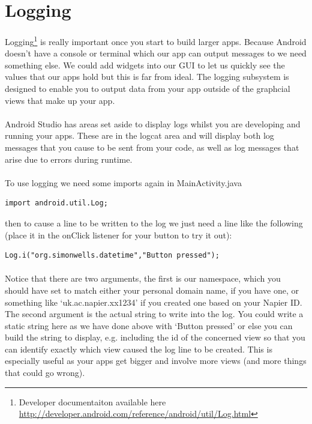 \documentclass[12pt, a4paper, twoside]{book}
\begin{document}
\section{Logging}
\paragraph{} Logging\footnote{Developer documentaiton available here \url{http://developer.android.com/reference/android/util/Log.html}} is really important once you start to build larger apps. Because Android doesn't have a console or terminal which our app can output messages to we need something else. We could add widgets into our GUI to let us quickly see the values that our apps hold but this is far from ideal. The logging subsystem is designed to enable you to output data from your app outside of the graphcial views that make up your app.

\paragraph{} Android Studio has areas set aside to display logs whilst you are developing and running your apps. These are in the logcat area and will display both log messages that you cause to be sent from your code, as well as log messages that arise due to errors during runtime.

\paragraph{} To use logging we need some imports again in MainActivity.java

\begin{lstlisting}
import android.util.Log;
\end{lstlisting}

then to cause a line to be written to the log we just need a line like the following (place it in the onClick listener for your button to try it out):

\begin{lstlisting}
Log.i("org.simonwells.datetime","Button pressed");
\end{lstlisting}

\paragraph{} Notice that there are two arguments, the first is our namespace, which you should have set to match either your personal domain name, if you have one, or something like `uk.ac.napier.xx1234' if you created one based on your Napier ID. The second argument is the actual string to write into the log. You could write a static string here as we have done above with `Button pressed' or else you can build the string to display, e.g. including the id of the concerned view so that you can identify exactly which view caused the log line to be created. This is especially useful as your apps get bigger and involve more views (and more things that could go wrong).
\end{document}
